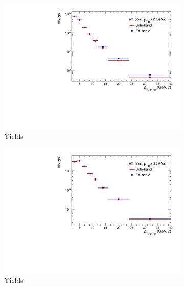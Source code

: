 \begin{figure}[bth]
\centering
\begin{subfigure}[b]{0.45\textwidth}
\includegraphics[width=\textwidth]{pPbplots/methodsComparison/DjetSpectra_methodComparison_FASTwoSDD_eff_ptD2}
\caption{Yields}
\end{subfigure}
\begin{subfigure}[b]{0.45\textwidth}
\includegraphics[width=\textwidth]{pPbplots/methodsComparison/DjetSpectra_methodComparison_FASTwoSDD_eff_ptD3}
\caption{Yields}
\end{subfigure}
\begin{subfigure}[b]{0.45\textwidth}

\end{subfigure}
\end{figure}
